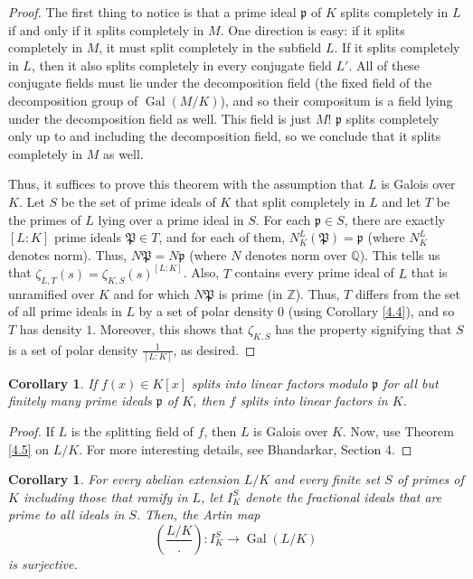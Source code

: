 \documentclass{article}
\DeclareMathOperator{\Gal}{Gal}
\newcommand{\QQ}{\mathbb{Q}}
\newcommand{\ZZ}{\mathbb{Z}}
\theoremstyle{plain}
\newtheorem{cor}[thm]{Corollary}
\theoremstyle{definition}
\theoremstyle{remark}
\numberwithin{equation}{section}
\numberwithin{thm}{section}
\begin{document}
\begin{proof}
The first thing to notice is that a prime ideal $\mathfrak{p}$ of $K$ splits completely in $L$ if and only if it splits completely in $M$. One direction is easy: if it splits completely in $M$, it must split completely in the subfield $L$. If it splits completely in $L$, then it also splits completely in every conjugate field $L'$. All of these conjugate fields must lie under the decomposition field (the fixed field of the decomposition group of $\Gal(M/K)$), and so their compositum is a field lying under the decomposition field as well. This field is just $M$! $\mathfrak{p}$ splits completely only up to and including the decomposition field, so we conclude that it splits completely in $M$ as well. 

Thus, it suffices to prove this theorem with the assumption that $L$ is Galois over $K$. Let $S$ be the set of prime ideals of $K$ that split completely in $L$ and let $T$ be the primes of $L$ lying over a prime ideal in $S$. For each $\mathfrak{p} \in S$, there are exactly $[L : K]$ prime ideals $\mathfrak{P} \in T$, and for each of them, $N_{K}^{L}(\mathfrak{P}) = \mathfrak{p}$ (where $N_{K}^{L}$ denotes norm). Thus, $N\mathfrak{P} = N\mathfrak{p}$ (where $N$ denotes norm over $\QQ$). This tells us that $\zeta_{L, T}(s) = \zeta_{K, S}(s)^{[L : K]}$. Also, $T$ contains every prime ideal of $L$ that is unramified over $K$ and for which $N\mathfrak{P}$ is prime (in $\ZZ$). Thus, $T$ differs from the set of all prime ideals in $L$ by a set of polar density $0$ (using Corollary \ref{4.4}), and so $T$ has density $1$. Moreover, this shows that $\zeta_{K, S}$ has the property signifying that $S$ is a set of polar density $\frac{1}{[L : K]}$, as desired.
\end{proof}

\begin{cor}
If $f(x) \in K[x]$ splits into linear factors modulo $\mathfrak{p}$ for all but finitely many prime ideals $\mathfrak{p}$ of $K$, then $f$ splits into linear factors in $K$.
\end{cor}

\begin{proof}
If $L$ is the splitting field of $f$, then $L$ is Galois over $K$. Now, use Theorem \ref{4.5} on $L/K$. For more interesting details, see Bhandarkar\cite{bhandarkar2018hilbert}, Section 4. 
\end{proof}

\begin{cor}
For every abelian extension $L/K$ and every finite set $S$ of primes of $K$ including those that ramify in $L$, let $I_{K}^{S}$ denote the fractional ideals that are prime to all ideals in $S$. Then, the Artin map $$\left(\frac{L/K}{.}\right) : I_{K}^{S} \longrightarrow \Gal(L/K)$$ is surjective. 
\end{cor}
\end{document}
